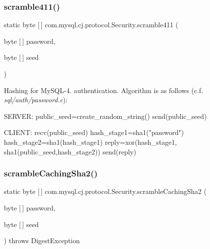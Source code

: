 \subsubsection{\texorpdfstring{scramble411()}{scramble411()}}
{\footnotesize\ttfamily static byte \mbox{[}$\,$\mbox{]} com.\+mysql.\+cj.\+protocol.\+Security.\+scramble411 (\begin{DoxyParamCaption}\item[{byte \mbox{[}$\,$\mbox{]}}]{password,  }\item[{byte \mbox{[}$\,$\mbox{]}}]{seed }\end{DoxyParamCaption})\hspace{0.3cm}{\ttfamily [static]}}

Hashing for My\+S\+Q\+L-\/4. authentication. Algorithm is as follows (c.\+f. {\itshape sql/auth/password.\+c})\+:


\begin{DoxyPre}
SERVER: public\_seed=create\_random\_string()
send(public\_seed)\end{DoxyPre}



\begin{DoxyPre}CLIENT: recv(public\_seed)
hash\_stage1=sha1("password")
hash\_stage2=sha1(hash\_stage1)
reply=xor(hash\_stage1, sha1(public\_seed,hash\_stage2))
send(reply)
\end{DoxyPre}
 \mbox{\label{classcom_1_1mysql_1_1cj_1_1protocol_1_1_security_a0f3d13ee7c5799791fe54f3857581bfd}} 
\subsubsection{\texorpdfstring{scramble\+Caching\+Sha2()}{scrambleCachingSha2()}}
{\footnotesize\ttfamily static byte \mbox{[}$\,$\mbox{]} com.\+mysql.\+cj.\+protocol.\+Security.\+scramble\+Caching\+Sha2 (\begin{DoxyParamCaption}\item[{byte \mbox{[}$\,$\mbox{]}}]{password,  }\item[{byte \mbox{[}$\,$\mbox{]}}]{seed }\end{DoxyParamCaption}) throws Digest\+Exception\hspace{0.3cm}{\ttfamily [static]}}

